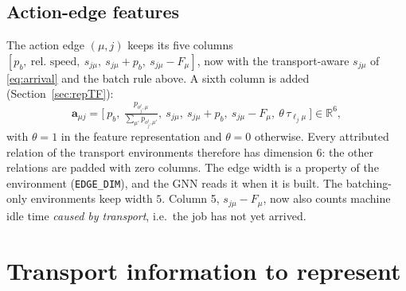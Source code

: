 \documentclass[11pt,a4paper]{article}
\newcommand{\R}{\mathbb{R}}
\newcommand{\loc}{\ell}
\begin{document}
\subsection{Action-edge features}
The action edge $(\mu,j)$ keeps its five columns
$[p_b,\ \text{rel.\ speed},\ s_{j\mu},\ s_{j\mu}+p_b,\ s_{j\mu}-F_\mu]$, now with the
transport-aware $s_{j\mu}$ of \eqref{eq:arrival} and the batch rule above. A
sixth column is added (Section~\ref{sec:repTF}):
\begin{equation}
  \mathbf{a}_{\mu j}=\bigl[\ p_b,\ \tfrac{p_{o_j^t,\mu}}{\sum_{\mu'}p_{o_j^t,\mu'}},\
  s_{j\mu},\ s_{j\mu}+p_b,\ s_{j\mu}-F_\mu,\ \theta\,\tau_{\loc_j\mu}\ \bigr]\in\R^6,
  \label{eq:actionedge}
\end{equation}
with $\theta=1$ in the feature representation and $\theta=0$ otherwise. Every
attributed relation of the transport environments therefore has dimension $6$:
the other relations are padded with zero columns. The edge width is a property
of the environment (\texttt{EDGE\_DIM}), and the GNN reads it when it is built. The
batching-only environments keep width $5$.
Column 5, $s_{j\mu}-F_\mu$, now also counts machine idle time \emph{caused by
transport}, i.e.\ the job has not yet arrived.

\section{Transport information to represent}
\label{sec:info}
\end{document}

